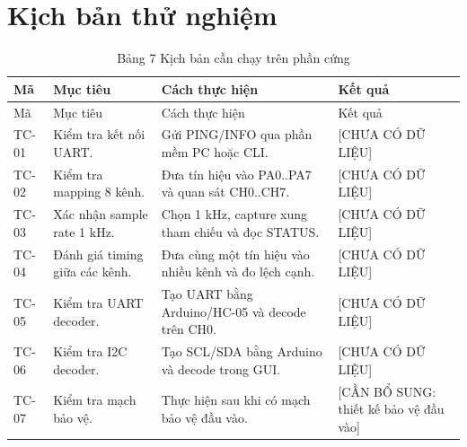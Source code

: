 \section{Kịch bản thử nghiệm}\label{kux1ecbch-bux1ea3n-thux1eed-nghiux1ec7m}

\begin{longtable}[]{@{}
  >{\raggedright\arraybackslash}p{}
  >{\raggedright\arraybackslash}p{}
  >{\raggedright\arraybackslash}p{}
  >{\raggedright\arraybackslash}p{}@{}}
\caption{Bảng 7 Kịch bản cần chạy trên phần cứng}\tabularnewline
\toprule\noalign{}
\begin{minipage}[b]{\linewidth}\raggedright
Mã
\end{minipage} & \begin{minipage}[b]{\linewidth}\raggedright
Mục tiêu
\end{minipage} & \begin{minipage}[b]{\linewidth}\raggedright
Cách thực hiện
\end{minipage} & \begin{minipage}[b]{\linewidth}\raggedright
Kết quả
\end{minipage} \\
\midrule\noalign{}
\endfirsthead
\toprule\noalign{}
\begin{minipage}[b]{\linewidth}\raggedright
Mã
\end{minipage} & \begin{minipage}[b]{\linewidth}\raggedright
Mục tiêu
\end{minipage} & \begin{minipage}[b]{\linewidth}\raggedright
Cách thực hiện
\end{minipage} & \begin{minipage}[b]{\linewidth}\raggedright
Kết quả
\end{minipage} \\
\midrule\noalign{}
\endhead
\bottomrule\noalign{}
\endlastfoot
TC-01 & Kiểm tra kết nối UART. & Gửi PING/INFO qua phần mềm PC hoặc CLI. & {[}CHƯA CÓ DỮ LIỆU{]} \\
TC-02 & Kiểm tra mapping 8 kênh. & Đưa tín hiệu vào PA0..PA7 và quan sát CH0..CH7. & {[}CHƯA CÓ DỮ LIỆU{]} \\
TC-03 & Xác nhận sample rate 1 kHz. & Chọn 1 kHz, capture xung tham chiếu và đọc STATUS. & {[}CHƯA CÓ DỮ LIỆU{]} \\
TC-04 & Đánh giá timing giữa các kênh. & Đưa cùng một tín hiệu vào nhiều kênh và đo lệch cạnh. & {[}CHƯA CÓ DỮ LIỆU{]} \\
TC-05 & Kiểm tra UART decoder. & Tạo UART bằng Arduino/HC-05 và decode trên CH0. & {[}CHƯA CÓ DỮ LIỆU{]} \\
TC-06 & Kiểm tra I2C decoder. & Tạo SCL/SDA bằng Arduino và decode trong GUI. & {[}CHƯA CÓ DỮ LIỆU{]} \\
TC-07 & Kiểm tra mạch bảo vệ. & Thực hiện sau khi có mạch bảo vệ đầu vào. & {[}CẦN BỔ SUNG: thiết kế bảo vệ đầu vào{]} \\
\end{longtable}


